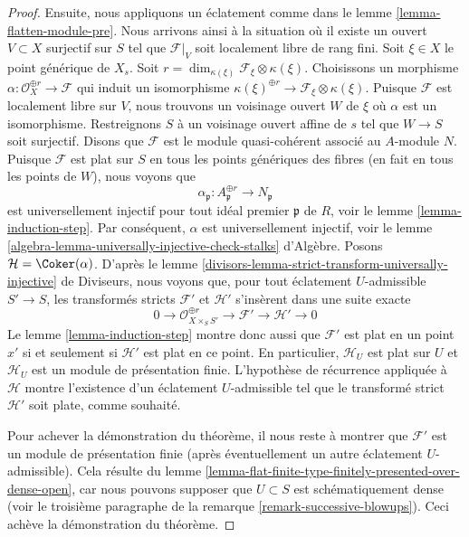 \begin{proof}
\medskip\noindent
Ensuite, nous appliquons un éclatement comme dans le lemme \ref{lemma-flatten-module-pre}.
Nous arrivons ainsi à la situation où il existe un
ouvert $V \subset X$ surjectif sur $S$ tel que $\mathcal{F}|_V$
soit localement libre de rang fini. Soit $\xi \in X$ le point générique de $X_s$. Soit
$r = \dim_{\kappa(\xi)} \mathcal{F}_\xi \otimes \kappa(\xi)$.
Choisissons un morphisme $\alpha : \mathcal{O}_X^{\oplus r} \to \mathcal{F}$
qui induit un isomorphisme
$\kappa(\xi)^{\oplus r} \to \mathcal{F}_\xi \otimes \kappa(\xi)$.
Puisque $\mathcal{F}$ est localement libre sur $V$, nous trouvons un voisinage ouvert
$W$ de $\xi$ où $\alpha$ est un isomorphisme. Restreignons $S$ à un
voisinage ouvert affine de $s$ tel que $W \to S$ soit surjectif. Disons que $\mathcal{F}$
est le module quasi-cohérent associé au $A$-module $N$. Puisque
$\mathcal{F}$ est plat sur $S$ en tous les points génériques des fibres
(en fait en tous les points de $W$), nous voyons que
$$
\alpha_\mathfrak p : A_\mathfrak p^{\oplus r} \to N_\mathfrak p
$$
est universellement injectif pour tout idéal premier $\mathfrak p$ de $R$, voir le
lemme \ref{lemma-induction-step}. Par conséquent, $\alpha$ est universellement injectif,
voir le lemme \ref{algebra-lemma-universally-injective-check-stalks} d'Algèbre.
Posons $\mathcal{H} = \Coker(\alpha)$.
D'après le lemme \ref{divisors-lemma-strict-transform-universally-injective} de Diviseurs,
nous voyons que, pour tout éclatement $U$-admissible $S' \to S$,
les transformés stricts $\mathcal{F}'$ et $\mathcal{H}'$
s'insèrent dans une suite exacte
$$
0 \to \mathcal{O}_{X \times_S S'}^{\oplus r} \to \mathcal{F}'
\to \mathcal{H}' \to 0
$$
Le lemme \ref{lemma-induction-step} montre donc aussi que $\mathcal{F}'$
est plat en un point $x'$ si et seulement si
$\mathcal{H}'$ est plat en ce point. En particulier, $\mathcal{H}_U$ est
plat sur $U$ et $\mathcal{H}_U$ est un module de présentation finie.
L'hypothèse de récurrence appliquée à $\mathcal{H}$ montre l'existence
d'un éclatement $U$-admissible tel que le transformé strict
$\mathcal{H}'$ soit plate, comme souhaité.

\medskip\noindent
Pour achever la démonstration du théorème, il nous reste à montrer que $\mathcal{F}'$
est un module de présentation finie (après éventuellement un autre
éclatement $U$-admissible). Cela résulte du
lemme \ref{lemma-flat-finite-type-finitely-presented-over-dense-open},
car nous pouvons supposer que $U \subset S$ est schématiquement dense (voir le
troisième paragraphe de la remarque \ref{remark-successive-blowups}).
Ceci achève la démonstration du théorème.
\end{proof}





